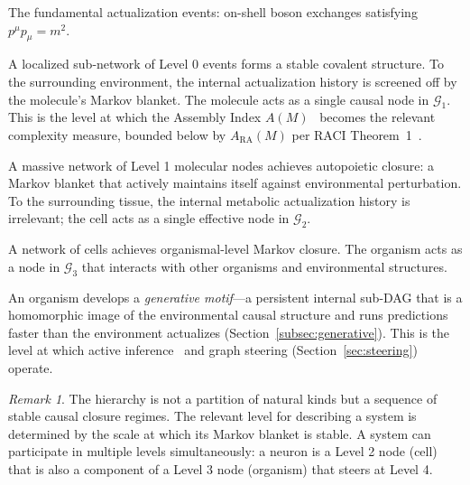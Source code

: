 \documentclass[11pt,a4paper]{article}
\theoremstyle{remark}
\newtheorem{remark}[theorem]{Remark}
\newcommand{\ARA}{A_{\mathrm{RA}}}
\newcommand{\GG}{\mathcal{G}}
\begin{document}
\begin{description}[leftmargin=1.5em]
  \item[\textbf{Level 0} ($\GG_0$)] The fundamental actualization events: on-shell
    boson exchanges satisfying $p^{\mu}p_{\mu} = m^2$.

  \item[\textbf{Level 1} ($\Pi_1 \to \GG_1$, \textit{Chemistry})] A localized
    sub-network of Level 0 events forms a stable covalent structure. To the
    surrounding environment, the internal actualization history is screened off
    by the molecule's Markov blanket. The molecule acts as a single causal
    node in $\GG_1$. This is the level at which the Assembly Index
    $A(M)$~\citep{Murray2023} becomes the relevant complexity measure, bounded
    below by $\ARA(M)$ per RACI Theorem~1~\citep{Sandeman2026c}.

  \item[\textbf{Level 2} ($\Pi_2 \to \GG_2$, \textit{Cells})] A massive network
    of Level 1 molecular nodes achieves autopoietic closure: a Markov blanket
    that actively maintains itself against environmental perturbation. To the
    surrounding tissue, the internal metabolic actualization history is
    irrelevant; the cell acts as a single effective node in $\GG_2$.

  \item[\textbf{Level 3} ($\Pi_3 \to \GG_3$, \textit{Organisms})] A network of
    cells achieves organismal-level Markov closure. The organism acts as a node
    in $\GG_3$ that interacts with other organisms and environmental structures.

  \item[\textbf{Level 4} ($\Pi_4 \to \GG_4$, \textit{Agentic Intelligence})]
    An organism develops a \emph{generative motif}---a persistent internal
    sub-DAG that is a homomorphic image of the environmental causal structure
    and runs predictions faster than the environment actualizes
    (Section~\ref{subsec:generative}). This is the level at which active
    inference~\citep{Friston2010} and graph steering (Section~\ref{sec:steering})
    operate.
\end{description}

\begin{remark}
The hierarchy is not a partition of natural kinds but a sequence of stable
causal closure regimes. The relevant level for describing a system is determined
by the scale at which its Markov blanket is stable. A system can participate in
multiple levels simultaneously: a neuron is a Level 2 node (cell) that is also
a component of a Level 3 node (organism) that steers at Level 4.
\end{remark}
\end{document}
